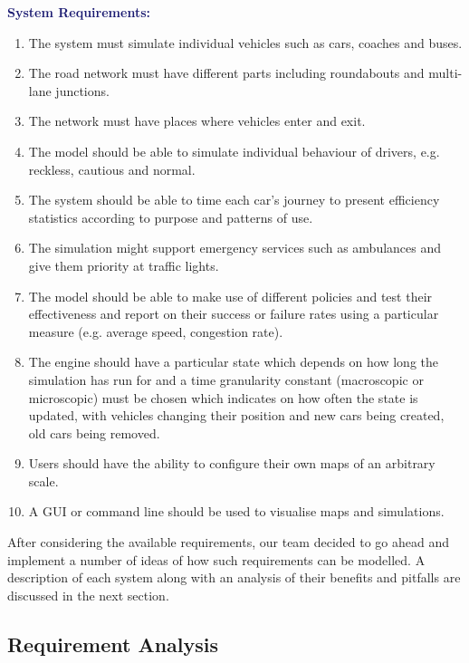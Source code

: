 \documentclass{article}
\begin{document}
	{\bf\textcolor{MidnightBlue}{System Requirements:}}
	\begin{enumerate}
		
		\item The system must simulate individual vehicles such as cars, coaches and buses.
		\item The road network must have different parts including roundabouts and multi-lane junctions. 
		\item The network must have places where vehicles enter and exit.
		\item The model should be able to simulate individual behaviour of drivers, e.g. reckless, cautious and normal. 
		\item The system should be able to time each car's journey to present efficiency statistics according to purpose and patterns of use. 
		\item The simulation might support emergency services such as ambulances and give them priority at traffic lights.
		\item The model should be able to make use of different policies and test their effectiveness and report on their success or failure rates using a particular measure (e.g. average speed, congestion rate).
		\item The engine should have a particular state which depends on how long the simulation has run for and a time granularity constant (macroscopic or microscopic) must be chosen which indicates on how often the state is updated, with vehicles changing their position and new cars being created, old cars being removed.  
		\item Users should have the ability to configure their own maps of an arbitrary scale. 
		\item A GUI or command line should be used to visualise maps and simulations.
	\end{enumerate}
	
	\noindent
	After considering the available requirements, our team decided to go ahead and implement a number of ideas of how such requirements can be modelled. A description of each system along with an analysis of their benefits and pitfalls are discussed in the next section. 
	
	
	\subsection{Requirement Analysis}\label{ssb:initial designs}
	
\end{document}
